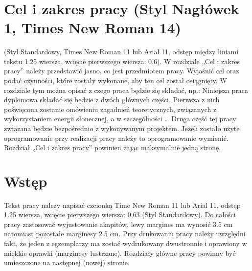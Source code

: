 \documentclass[11pt,a4paper]{article}
\begin{document}




\renewcommand{\contentsname}{\LARGE \normalfont \MakeUppercase{Spis treści} (Times New Roman 16)}

{\fontsize{12}{16}\selectfont
\tableofcontents
}

\newpage

\section{Cel i zakres pracy (Styl Nagłówek 1, Times New Roman 14)}
\paragraph{}
(Styl Standardowy, Times New Roman 11 lub Arial 11, odstęp między liniami tekstu 1.25 wiersza, wcięcie pierwszego wiersza: 0,6). W rozdziale „Cel i zakres pracy” należy przedstawić jasno, co jest przedmiotem pracy. Wyjaśnić cel oraz podać czynności, które zostały wykonane, aby ten cel został osiągnięty. W rozdziale tym można opisać z czego praca będzie się składać, np.: 
Niniejsza praca dyplomowa składać się będzie z dwóch głównych części. Pierwsza z nich poświęcona zostanie omówieniu zagadnień teoretycznych, związanych z wykorzystaniem energii słonecznej, a w szczególności … Druga część tej pracy związana będzie bezpośrednio z wykonywanym projektem.
Jeżeli zostało użyte oprogramowanie przy realizacji pracy należy to oprogramowanie wymienić. Rozdział „Cel i zakres pracy” powinien zając maksymalnie jedną stronę. 

\newpage

\section{Wstęp}
\paragraph{}
Tekst pracy należy napisać czcionką Time New Roman 11 lub Arial 11, odstęp 1.25 wiersza, wcięcie pierwszego wiersza: 0,63 (Styl Standardowy). Do całości pracy zastosować wyjustowanie akapitów, lewy margines ma wynosić 3.5 cm natomiast pozostałe marginesy 2.5 cm. Przy drukowaniu pracy należy uwzględni fakt, że jeden z egzemplarzy ma zostać wydrukowany dwustronnie i oprawiony w miękkie oprawki (marginesy lustrzane). Rozdziały główne pracy powinny być umieszczone na następnej (nowej) stronie.
\end{document}
